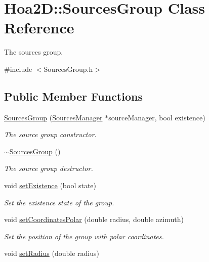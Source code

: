 \hypertarget{class_hoa2_d_1_1_sources_group}{\section{Hoa2\-D\-:\-:Sources\-Group Class Reference}
\label{class_hoa2_d_1_1_sources_group}
}


The sources group.  




{\ttfamily \#include $<$Sources\-Group.\-h$>$}

\subsection*{Public Member Functions}
\begin{DoxyCompactItemize}
\item 
\hyperlink{class_hoa2_d_1_1_sources_group_a152164cb823c1634c0b54ea5529aae98}{Sources\-Group} (\hyperlink{class_hoa2_d_1_1_sources_manager}{Sources\-Manager} $\ast$source\-Manager, bool existence)
\begin{DoxyCompactList}\small\item\em The source group constructor. \end{DoxyCompactList}\item 
\hyperlink{class_hoa2_d_1_1_sources_group_a8032706e849ee56ef785e38654d6349d}{$\sim$\-Sources\-Group} ()
\begin{DoxyCompactList}\small\item\em The source group destructor. \end{DoxyCompactList}\item 
void \hyperlink{class_hoa2_d_1_1_sources_group_a1222a1761440a1121290710b67321fe8}{set\-Existence} (bool state)
\begin{DoxyCompactList}\small\item\em Set the existence state of the group. \end{DoxyCompactList}\item 
void \hyperlink{class_hoa2_d_1_1_sources_group_a07df80c3a4f3d5e3e7aa0554f5ad44fa}{set\-Coordinates\-Polar} (double radius, double azimuth)
\begin{DoxyCompactList}\small\item\em Set the position of the group with polar coordinates. \end{DoxyCompactList}\item 
void \hyperlink{class_hoa2_d_1_1_sources_group_a2fae46ab968c256f2dc81ea3edfc9d08}{set\-Radius} (double radius)

\end{DoxyCompactItemize}
